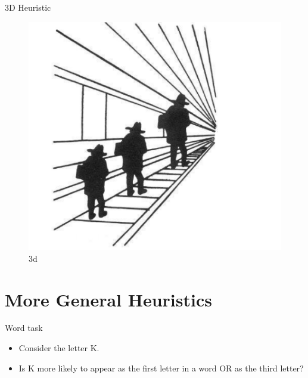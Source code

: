 \documentclass[
  ignorenonframetext,
]{beamer}
\providecommand{\tightlist}{%
  \setlength{\itemsep}{0pt}\setlength{\parskip}{0pt}}\usepackage{longtable,booktabs,array}
\begin{document}
\begin{frame}{3D Heuristic}
\protect\hypertarget{d-heuristic}{}
\begin{figure}

{\centering \includegraphics{resources/images/3dheuristic.png}

}

\caption{3d}

\end{figure}
\end{frame}

\hypertarget{more-general-heuristics}{%
\section{More General Heuristics}\label{more-general-heuristics}}

\begin{frame}{Word task}
\protect\hypertarget{word-task}{}
\begin{itemize}
\tightlist
\item
  Consider the letter K.
\end{itemize}

\begin{itemize}
\tightlist
\item
  Is K more likely to appear as the first letter in a word OR as the
  third letter?
\end{itemize}
\end{frame}
\end{document}
